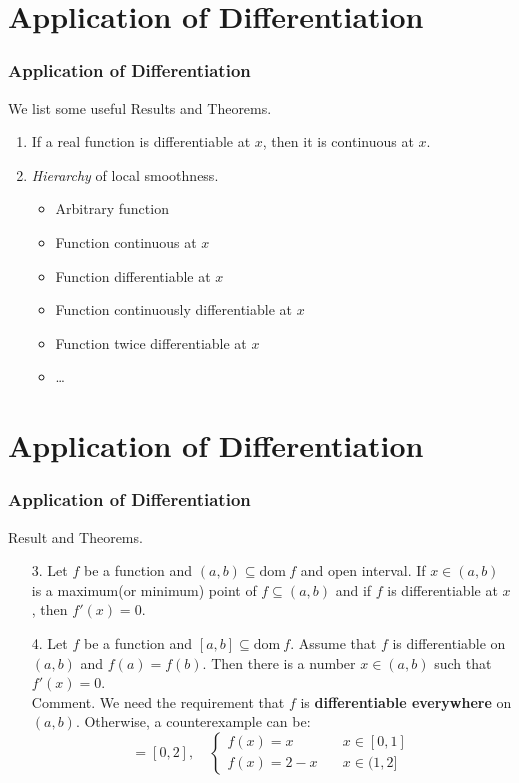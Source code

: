\documentclass[12pt, t]{beamer}
\renewcommand{\emph}[1]{{\color{Turquoise3}\textsl{#1}}}
\begin{document}
\section{Application of Differentiation}
\begin{frame}
    \frametitle{Application of Differentiation}
We list some useful Results and Theorems.
\begin{enumerate}
    \item If a real function is differentiable at $x$, then it is continuous at $x$.
    \vspace{0.5em}
    \item \emph{Hierarchy} of local smoothness.
    \begin{itemize}
        \item Arbitrary function
        \item Function continuous at $x$
        \item Function differentiable at $x$
        \item Function continuously differentiable at $x$
        \item Function twice differentiable at $x$
        \item \dots
    \end{itemize}
\end{enumerate}


\end{frame}

\section{Application of Differentiation}
\begin{frame}
    \frametitle{Application of Differentiation}
Result and Theorems.\\
\begin{enumerate}
    \item[3.] Let $f$ be a function and $(a,b)\subseteq \text{dom}\  f$ and open interval. If $x\in(a,b)$ is a 
        maximum(or minimum) point of $f\subseteq(a,b)$ and if $f$ is differentiable at $x$, then $f'(x)=0$.
    \vspace{0.5em}
    \item[4.] Let $f$ be a function and $[a,b]\subseteq \text{dom}\  f$. Assume that $f$ is differentiable on $(a,b)$ and 
        $f(a)=f(b)$. Then there is a number $x\in(a,b)$ such that $f'(x)=0$.\\
        \vspace{0.3em}
        Comment. We need the requirement that $f$ is \textbf{differentiable everywhere} on $(a,b)$. Otherwise, a 
        counterexample can be:
        \begin{equation*}
            [a,b]=[0,2],\quad 
            \begin{cases}
                f(x)=x\qquad &x\in[0,1]\\
                f(x)=2-x\quad &x\in(1,2]
            \end{cases}
        \end{equation*}
        
\end{enumerate}


\end{frame}
\end{document}
